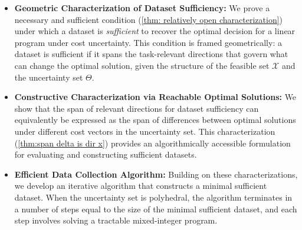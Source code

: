 \documentclass[11pt]{article}
\theoremstyle{plain}
\theoremstyle{definition}
\newcommand{\OB}[1]{\noindent{\textcolor{blue}{\{{\textbf{OB}:} #1\}}}}
\newcommand{\cX}{\mathcal{X}}
\begin{document}


\begin{itemize}
    \item 
    \textbf{Geometric Characterization of Dataset Sufficiency:}
We prove a necessary and sufficient condition (\cref{thm: relatively open characterization}) under which a dataset is \textit{sufficient} to recover the optimal decision for a linear program under cost uncertainty. This condition is framed geometrically: a dataset is sufficient if it spans the task-relevant directions that govern what can change the optimal solution, given the structure of the feasible set $\cX$ and the uncertainty set $\Theta$.

\item
\textbf{Constructive Characterization via Reachable Optimal Solutions:}
We show that the span of relevant directions for dataset sufficiency can equivalently be expressed as the span of differences between optimal solutions under different cost vectors in the uncertainty set. This characterization (\cref{thm:span delta is dir x}) provides an algorithmically accessible formulation for evaluating and constructing sufficient datasets.

 \item
\textbf{Efficient Data Collection Algorithm:}
Building on these characterizations, we develop an iterative algorithm that constructs a minimal sufficient dataset. When the uncertainty set is polyhedral, the algorithm terminates in a number of steps equal to the size of the minimal sufficient dataset, and each step involves solving a tractable mixed-integer program.
\end{itemize}


\end{document}
